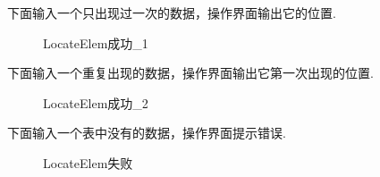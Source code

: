 \documentclass[supercite]{Experimental_Report}
\theoremstyle{definition}
\begin{document}
\noindent
下面输入一个只出现过一次的数据，操作界面输出它的位置.
\begin{figure}[htbp]
	\centering
	\centering
	\caption{LocateElem成功\_1}
	\label{fig1-27}
\end{figure}

\noindent
下面输入一个重复出现的数据，操作界面输出它第一次出现的位置.
\begin{figure}[htbp]
	\centering
	\centering
	\caption{LocateElem成功\_2}
	\label{fig1-28}
\end{figure}

\clearpage
\noindent
下面输入一个表中没有的数据，操作界面提示错误.
\begin{figure}[htbp]
	\centering
	\centering
	\caption{LocateElem失败}
	\label{fig1-29}
\end{figure}
\end{document}
